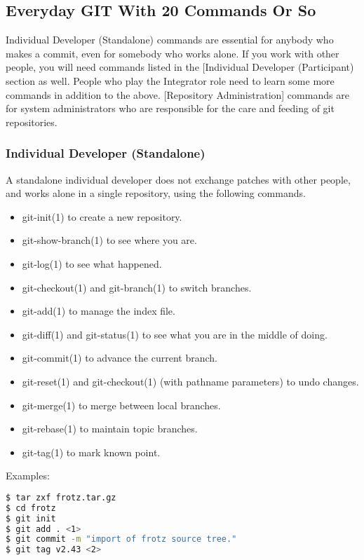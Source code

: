 \subsection{Everyday GIT With 20 Commands Or So}
Individual Developer (Standalone) commands are essential for anybody who makes
a commit, even for somebody who works alone.  If you work with other people,
you will need commands listed in the [Individual Developer (Participant)
section as well.  People who play the Integrator role need to learn some more
commands in addition to the above.  [Repository Administration] commands are
for system administrators who are responsible for the care and feeding of git
repositories.

\subsubsection{Individual Developer (Standalone)}
A standalone individual developer does not exchange patches with other people,
and works alone in a single repository, using the following commands.

\begin{itemize}
\setlength{\itemsep}{0cm}
\setlength{\parskip}{0cm}
\item git-init(1) to create a new repository.
\item git-show-branch(1) to see where you are.
\item git-log(1) to see what happened.
\item git-checkout(1) and git-branch(1) to switch branches.
\item git-add(1) to manage the index file.
\item git-diff(1) and git-status(1) to see what you are in the middle of doing.
\item git-commit(1) to advance the current branch.
\item git-reset(1) and git-checkout(1) (with pathname parameters) to undo changes.
\item git-merge(1) to merge between local branches.
\item git-rebase(1) to maintain topic branches.
\item git-tag(1) to mark known point.
\end{itemize}

Examples:\\
\lstset{basicstyle=\scriptsize, numbers=none, captionpos=b, tabsize=4}
\begin{lstlisting}[caption=Use a tarball as a starting point for a new repository,language={bash},
breaklines=true,label=lst:useatarballasastartingpointforanewrepository]
$ tar zxf frotz.tar.gz
$ cd frotz
$ git init
$ git add . <1>
$ git commit -m "import of frotz source tree."
$ git tag v2.43 <2>
\end{lstlisting}

